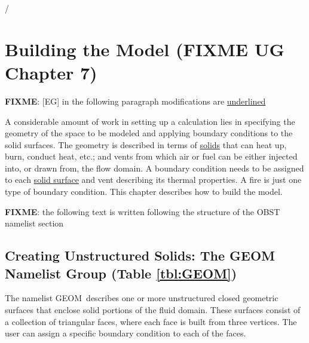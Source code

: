 \documentclass[12pt]{article}
\begin{document}


\vspace{1.0in}

%
%
%
%
%
%
%
%
/

\chapter{Building the Model (FIXME UG Chapter 7)}

\textbf{FIXME}: [EG] in the following paragraph modifications are \underline{underlined}

A considerable amount of work in setting up a calculation lies in specifying the geometry of the space to
be modeled and applying boundary conditions to the solid surfaces. The geometry is described in terms of
\underline{solids} that can heat up, burn, conduct heat, etc.; and vents from which air or fuel can be
either injected into, or drawn from, the flow domain. A boundary condition needs to be assigned to each
\underline{solid surface} and vent describing its thermal properties. A fire is just one type of boundary condition.
This chapter describes how to build the model.

\textbf{FIXME}: the following text is written following the structure of the {\ct OBST} namelist section

\section{Creating Unstructured Solids: The \texorpdfstring{{\ct GEOM}}{GEOM} Namelist Group (Table \ref{tbl:GEOM})}
\label{info:GEOM}

The namelist {\ct GEOM}\ describes one or more unstructured closed geometric surfaces that enclose solid portions
of the fluid domain. These surfaces consist of a collection of triangular faces, where each face is built
from three vertices. The user can assign a specific boundary condition to each of the faces.
\end{document}
